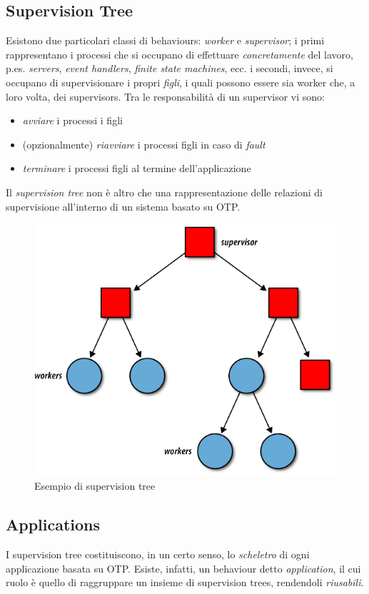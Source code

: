 %
\subsection{Supervision Tree}
%
Esistono due particolari classi di behaviours: \emph{worker} e \emph{supervisor}; 
%
i primi rappresentano i processi che si occupano di effettuare \emph{concretamente} del lavoro, 
p.es. \emph{servers}, \emph{event handlers}, \emph{finite state machines}, ecc.
%
i secondi, invece, si occupano di supervisionare i propri \emph{figli}, i quali possono essere sia
worker che, a loro volta, dei supervisors. 
%
Tra le responsabilit\`a di un supervisor vi sono:
\begin{itemize}
\item \emph{avviare} i processi i figli
\item (opzionalmente) \emph{riavviare} i processi figli in caso di \emph{fault}
\item \emph{terminare} i processi figli al termine dell'applicazione
\end{itemize}
%

%
Il \emph{supervision tree} non \`e altro che una rappresentazione delle relazioni di supervisione 
all'interno di un sistema basato su OTP.
%
\begin{figure}[!h]
\centering
\includegraphics[width=350pt]{img/supervision-tree.png}
\caption{Esempio di supervision tree}
\end{figure}
%

%

%
\subsection{Applications}
%
I supervision tree costituiscono, in un certo senso, lo \emph{scheletro} di ogni applicazione
basata su OTP. Esiste, infatti, un behaviour detto \emph{application}, il cui ruolo \`e quello
di raggruppare un insieme di supervision trees, rendendoli \emph{riusabili}. 
%

